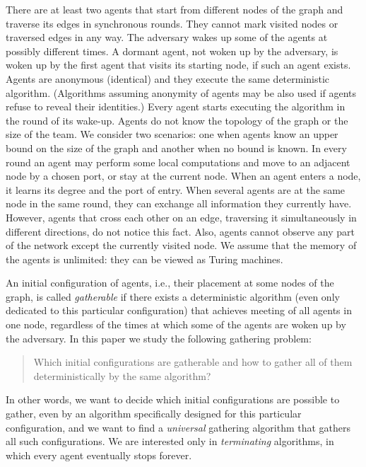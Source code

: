 \documentclass[11pt]{article}
\begin{document}
There are at least two agents that start from different nodes of the graph  and  traverse its edges in synchronous rounds.
They cannot mark visited nodes or traversed edges in any way.
The adversary wakes up some of the agents at possibly different times. A dormant agent, not woken up by the adversary,  is woken up by the first agent that visits
its starting node, if such an agent exists. Agents are anonymous (identical) and they execute the same deterministic algorithm. (Algorithms assuming anonymity of agents may be also used if agents refuse to reveal their identities.)
Every agent starts executing the algorithm in the round of its wake-up.
Agents do not  know the topology of the graph or the size of the team. We consider two scenarios: one when agents know
an upper bound on the size of the graph and another when no bound is known. 
In every round an agent may perform some local computations and move to an adjacent node by a chosen port, or stay at the current node.
When an agent enters a node, it learns its degree and the port of entry. When several agents are at the same node in the same round,
they  can exchange all information they currently have. However, agents that cross each other
on an edge, traversing it simultaneously in different directions, do not notice this fact. Also, agents cannot observe any part of the network except the currently visited node.
We assume that the memory of the agents is unlimited: they can be viewed as 
Turing machines.

An initial configuration of agents, i.e., their placement at some nodes of the graph, is called {\em gatherable} if there exists a deterministic algorithm 
(even only dedicated to this particular configuration) that achieves meeting of all
agents in one node, regardless of the times at which some of the agents are woken up by the adversary. In this paper we study the following gathering problem:
\begin{quote}
Which initial configurations are gatherable and how to gather all of them deterministically by the same algorithm?
\end{quote}
In other words, we want to decide which initial configurations are possible to gather, even by an algorithm specifically designed for this particular
configuration, and we want to find a {\em universal} gathering algorithm that gathers all such configurations. We are interested only in {\em terminating}
algorithms, in which every agent eventually stops forever.
\end{document}
